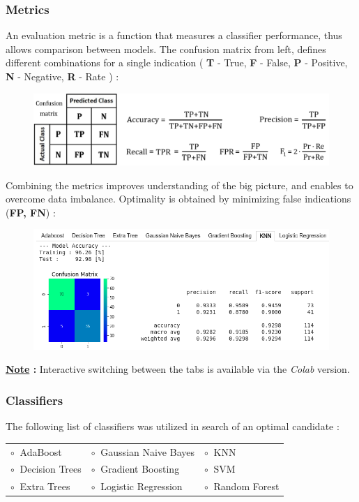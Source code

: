\documentclass[12pt]{article}
\numberwithin{equation}{section}
\begin{document}
\begin{flushleft}
\subsubsection{Metrics}
An evaluation metric is a function that measures a classifier performance, thus allows comparison between models. The confusion matrix from left, defines different combinations for a single indication ( \textbf{T} - True, \textbf{F} - False, \textbf{P} - Positive, \textbf{N} - Negative, \textbf{R} - Rate ) : \\[0.75cm]

\begin{figure}[H]
\centering
\includegraphics[width=0.95\linewidth, center]{Mat_conf.png}
\end{figure}
Combining the metrics improves understanding of the big picture, and enables to overcome data imbalance. Optimality is obtained by minimizing false indications (\textbf{FP, FN}) : \\[0.75cm]

\begin{figure}[H]
\centering
\includegraphics[width=1.05\linewidth, center]{Mat_conf_1.png}
\end{figure}

\textbf{\underline{Note} :} Interactive switching between the tabs is available via the \textit{Colab} version.

\newpage

\subsubsection{Classifiers}
The following list of classifiers was utilized in search of an optimal candidate : \\[5mm]
\begin{tabular}{p{5.5cm} p{5cm} p{5cm}}
\hspace{2cm} $\circ \ $ AdaBoost & $\circ \ $ Gaussian Naive Bayes & $\circ \ $ KNN \\[1ex]
\hspace{2cm} $\circ \ $ Decision Trees & $\circ \ $ Gradient Boosting  &  $\circ \ $ SVM \\[1ex]
\hspace{2cm} $\circ \ $ Extra Trees & $\circ \ $ Logistic Regression & $\circ \ $ Random Forest
\end{tabular}


\end{flushleft}
\end{document}
